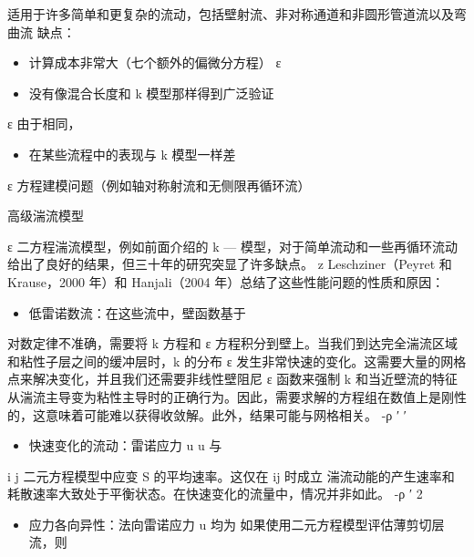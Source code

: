 \documentclass[11pt,a4paper,openany,fontset=none]{ctexbook}
\begin{document}
适用于许多简单和更复杂的流动，包括壁射流、非对称通道和非圆形管道流以及弯曲流
缺点：

\begin{itemize}

\item 计算成本非常大（七个额外的偏微分方程） ε

\item 没有像混合长度和 k 模型那样得到广泛验证

\end{itemize}

ε
由于相同，

\begin{itemize}

\item 在某些流程中的表现与 k 模型一样差

\end{itemize}

ε 方程建模问题（例如轴对称射流和无侧限再循环流）

高级湍流模型

ε 二方程湍流模型，例如前面介绍的 k — 模型，对于简单流动和一些再循环流动给出了良好的结果，但三十年的研究突显了许多缺点。 z Leschziner（Peyret 和 Krause，2000 年）和 Hanjali（2004 年）总结了这些性能问题的性质和原因：

\begin{itemize}

\item 低雷诺数流：在这些流中，壁函数基于

\end{itemize}

对数定律不准确，需要将 k 方程和 ε 方程积分到壁上。当我们到达完全湍流区域和粘性子层之间的缓冲层时，k 的分布 ε 发生非常快速的变化。这需要大量的网格点来解决变化，并且我们还需要非线性壁阻尼 ε 函数来强制 k 和当近壁流的特征从湍流主导变为粘性主导时的正确行为。因此，需要求解的方程组在数值上是刚性的，这意味着可能难以获得收敛解。此外，结果可能与网格相关。 -ρ ′ ′

\begin{itemize}

\item 快速变化的流动：雷诺应力 u u 与

\end{itemize}

i j 二元方程模型中应变 S 的平均速率。这仅在 ij 时成立
湍流动能的产生速率和耗散速率大致处于平衡状态。在快速变化的流量中，情况并非如此。 -ρ ′ 2

\begin{itemize}

\item 应力各向异性：法向雷诺应力 u 均为
如果使用二元方程模型评估薄剪切层流，则

\end{itemize}
\end{document}
